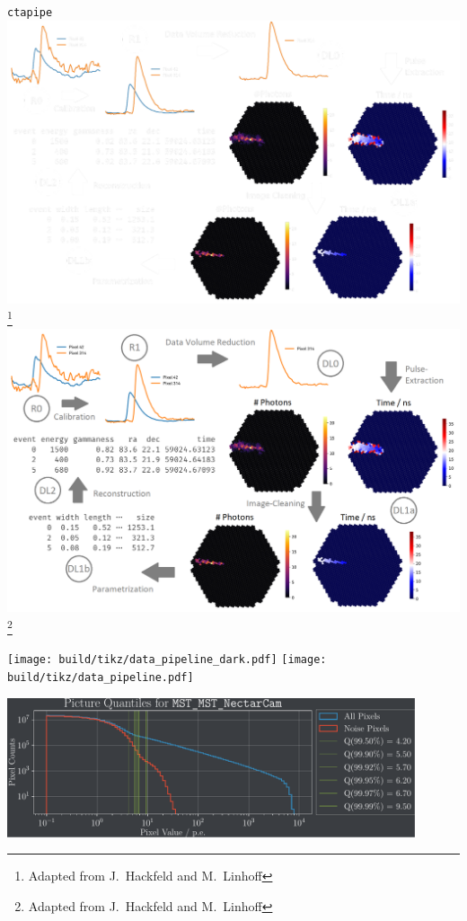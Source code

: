 \begin{frame}{\texttt{ctapipe}}
    {%
    \centering
    \includegraphics[height=0.9\textheight]{graphics/ctapipe_light.pdf}
    \vspace{-0.25cm}
    \footnote{\textcolor{white!85!black}{Adapted from J.~Hackfeld and M.~Linhoff}}
    }
    {%
    \centering
    \includegraphics[height=0.9\textheight]{graphics/ctapipe.png}
    \vspace{-0.25cm}
    \footnote{\textcolor{darkgray!85!black}{Adapted from J.~Hackfeld and M.~Linhoff}}
    }
\end{frame}

\begin{frame}
    {%
    \centering
    \texttt{[image: build/tikz/data\_pipeline\_dark.pdf]}
    }
    {%
    \centering
    \texttt{[image: build/tikz/data\_pipeline.pdf]}
    }
\end{frame}

    {%
    
    }
    {%
    
    }
\begin{frame}
    \centering
    \includegraphics[width=0.9\textwidth]{build/quantiles_plot.pdf}
\end{frame}